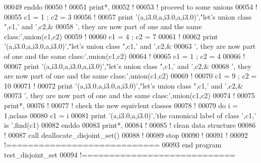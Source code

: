 \begin{DoxyCode}
00049   \textcolor{keyword}{enddo}
00050   \textcolor{comment}{!}
00051   print*,
00052   \textcolor{comment}{!}
00053   \textcolor{comment}{! proceed to some unions}
00054   \textcolor{comment}{!}
00055   c1 = 1 ; c2 = 3
00056   \textcolor{comment}{!}
00057   print \textcolor{stringliteral}{'(a,i3.0,a,i3.0,a,i3.0)'},\textcolor{stringliteral}{"let's union class "},c1,\textcolor{stringliteral}{' and '},c2,&
00058        \textcolor{stringliteral}{', they are now part of one and the same class:'},union(c1,c2)
00059   \textcolor{comment}{!}
00060   c1 = 4 ; c2 = 7
00061   \textcolor{comment}{!}
00062   print \textcolor{stringliteral}{'(a,i3.0,a,i3.0,a,i3.0)'},\textcolor{stringliteral}{"let's union class "},c1,\textcolor{stringliteral}{' and '},c2,&
00063        \textcolor{stringliteral}{', they are now part of one and the same class:'},union(c1,c2)
00064   \textcolor{comment}{!}
00065   c1 = 1 ; c2 = 4
00066   \textcolor{comment}{!}
00067   print \textcolor{stringliteral}{'(a,i3.0,a,i3.0,a,i3.0)'},\textcolor{stringliteral}{"let's union class "},c1,\textcolor{stringliteral}{' and '},c2,&
00068        \textcolor{stringliteral}{', they are now part of one and the same class:'},union(c1,c2)
00069   \textcolor{comment}{!}
00070   c1 = 9 ; c2 = 10
00071   \textcolor{comment}{!}
00072   print \textcolor{stringliteral}{'(a,i3.0,a,i3.0,a,i3.0)'},\textcolor{stringliteral}{"let's union class "},c1,\textcolor{stringliteral}{' and '},c2,&
00073        \textcolor{stringliteral}{', they are now part of one and the same class:'},union(c1,c2)
00074   \textcolor{comment}{!}
00075   print*,
00076   \textcolor{comment}{!}
00077   \textcolor{comment}{! check the new equivlent classes}
00078   \textcolor{comment}{!}
00079   \textcolor{keyword}{do} i = 1,nclass
00080      c1 = i
00081      print \textcolor{stringliteral}{'(a,i3.0,a,i3.0)'},\textcolor{stringliteral}{'the canonical label of class '},c1,\textcolor{stringliteral}{' is '},find(c1)
00082   \textcolor{keyword}{enddo}
00083   print*,
00084   \textcolor{comment}{!}
00085   \textcolor{comment}{! clean data structure}
00086   \textcolor{comment}{!}
00087   call deallocate\_disjoint\_set()
00088   \textcolor{comment}{!}
00089   stop
00090   \textcolor{comment}{!}
00091 \textcolor{comment}{!}
00092 \textcolor{comment}{!============================}
00093 \textcolor{keyword}{end program test\_disjoint\_set}
00094 \textcolor{comment}{!============================}
\end{DoxyCode}
